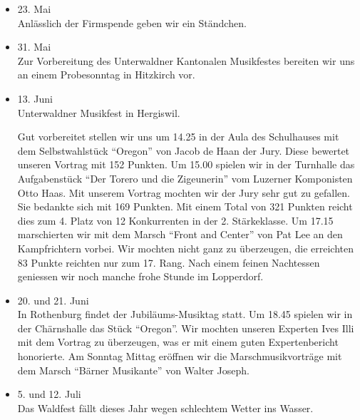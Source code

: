 \begin{history}
\begin{itemize}
        \item 23. Mai\\
              Anlässlich der Firmspende geben wir ein Ständchen.

        \item 31. Mai\\
              Zur Vorbereitung des Unterwaldner Kantonalen Musikfestes bereiten wir
              uns an einem Probesonntag in Hitzkirch vor.

        \item 13. Juni\\
              Unterwaldner Musikfest in Hergiswil.

              Gut vorbereitet stellen wir uns um 14.25 in der Aula des Schulhauses mit
              dem Selbstwahlstück \enquote{Oregon} von Jacob de Haan der Jury. Diese
              bewertet unseren Vortrag mit 152 Punkten. Um 15.00 spielen wir in der
              Turnhalle das Aufgabenstück \enquote{Der Torero und die Zigeunerin} vom
              Luzerner Komponisten Otto Haas. Mit unserem Vortrag mochten wir der Jury
              sehr gut zu gefallen. Sie bedankte sich mit 169 Punkten. Mit einem Total
              von 321 Punkten reicht dies zum 4. Platz von 12 Konkurrenten in der 2.
              Stärkeklasse. Um 17.15 marschierten wir mit dem Marsch \enquote{Front
                  and Center} von Pat Lee an den Kampfrichtern vorbei. Wir mochten nicht
              ganz zu überzeugen, die erreichten 83 Punkte reichten nur zum 17. Rang.
              Nach einem feinen Nachtessen geniessen wir  noch manche frohe Stunde im
              Lopperdorf.

        \item 20. und 21. Juni\\
              In Rothenburg findet der Jubiläums-Musiktag statt. Um 18.45 spielen wir
              in der Chärnshalle das Stück \enquote{Oregon}. Wir mochten unseren
              Experten Ives Illi mit dem Vortrag zu überzeugen, was er mit einem guten
              Expertenbericht honorierte. Am Sonntag Mittag eröffnen wir die
              Marschmusikvorträge mit dem Marsch \enquote{Bärner Musikante} von Walter
              Joseph.

        \item 5. und 12. Juli\\
              Das Waldfest fällt dieses Jahr wegen schlechtem Wetter ins Wasser.


\end{itemize}
\end{history}
